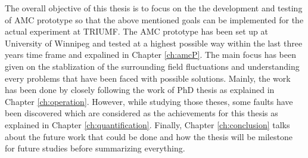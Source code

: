 The overall objective of this thesis is to focus on the the development and testing of AMC prototype so that the above mentioned goals can be implemented for the actual experiment at TRIUMF. The AMC prototype has been set up at University of Winnipeg and tested at a highest possible way within the last three years time frame and expalined in Chapter \ref{ch:amcP}. The main focus has been given on the stablization of the surrounding field fluctuations and understanding every problems that have been faced with possible solutions. Mainly, the work has been done by closely following the work of PhD thesis \cite{bea,lins,rawlik} as explained in Chapter \ref{ch:operation}. However, while studying those theses, some faults have been discovered which are considered as the achievements for this thesis as explained in Chapter \ref{ch:quantification}. Finally, Chapter \ref{ch:conclusion} talks about the future work that could be done and how the thesis will be milestone for future studies before summarizing everything.






